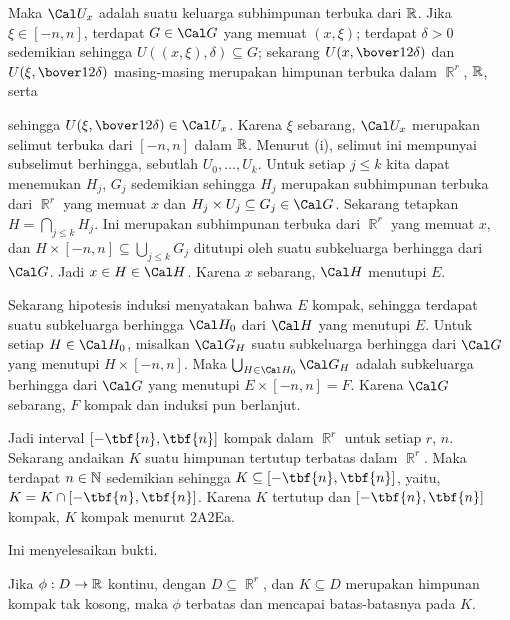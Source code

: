 {

\noindent Maka $\Cal U_x$ adalah suatu keluarga subhimpunan terbuka dari
$\Bbb R$. Jika $\xi\in[-n,n]$, terdapat $G\in\Cal G$ yang memuat
$(x,\xi)$; terdapat $\delta>0$ sedemikian sehingga
$U((x,\xi),\delta)\subseteq G$; sekarang $U(x,\bover12\delta)$ dan
$U(\xi,\bover12\delta)$ masing-masing merupakan himpunan terbuka dalam
$\BbbR^r$, $\Bbb R$, serta


\noindent sehingga $U(\xi,\bover12\delta)\in\Cal U_x$. Karena $\xi$
sebarang, $\Cal U_x$ merupakan selimut terbuka dari $[-n,n]$ dalam
$\Bbb R$. Menurut (i), selimut ini mempunyai subselimut berhingga, sebutlah
$U_0,\ldots,U_k$. Untuk setiap $j\le k$ kita dapat menemukan $H_j$, $G_j$
sedemikian sehingga $H_j$ merupakan subhimpunan terbuka dari $\BbbR^r$ yang
memuat $x$ dan $H_j\times U_j\subseteq G_j\in\Cal G$. Sekarang tetapkan
$H=\bigcap_{j\le k}H_j$. Ini merupakan subhimpunan terbuka dari $\BbbR^r$
yang memuat $x$, dan $H\times[-n,n]\subseteq\bigcup_{j\le k}G_j$ ditutupi
oleh suatu subkeluarga berhingga dari $\Cal G$. Jadi $x\in H\in\Cal H$.
Karena $x$ sebarang, $\Cal H$ menutupi $E$. \Qed

\medskip

 Sekarang hipotesis induksi menyatakan bahwa $E$ kompak,
sehingga terdapat suatu subkeluarga berhingga $\Cal H_0$ dari $\Cal H$ yang
menutupi $E$. Untuk setiap $H\in\Cal H_0$, misalkan $\Cal G_H$ suatu
subkeluarga berhingga dari $\Cal G$ yang menutupi $H\times[-n,n]$. Maka
$\bigcup_{H\in\Cal H_0}\Cal G_H$ adalah subkeluarga berhingga dari $\Cal G$
yang menutupi $E\times[-n,n]=F$. Karena $\Cal G$ sebarang, $F$ kompak dan
induksi pun berlanjut.

\medskip

 Jadi interval $[-\tbf{n},\tbf{n}]$ kompak dalam
$\BbbR^r$ untuk setiap $r$, $n$. Sekarang andaikan $K$ suatu himpunan
tertutup terbatas dalam $\BbbR^r$. Maka terdapat $n\in\Bbb N$ sedemikian
sehingga $K\subseteq[-\tbf{n},\tbf{n}]$, yaitu,
$K=K\cap[-\tbf{n},\tbf{n}]$. Karena $K$ tertutup dan
$[-\tbf{n},\tbf{n}]$ kompak, $K$ kompak menurut 2A2Ea.

Ini menyelesaikan bukti.
}%

 Jika $\phi:D\to\Bbb R$ kontinu, dengan
$D\subseteq\BbbR^r$, dan $K\subseteq D$ merupakan himpunan kompak tak kosong,
maka $\phi$ terbatas dan mencapai batas-batasnya pada $K$.

